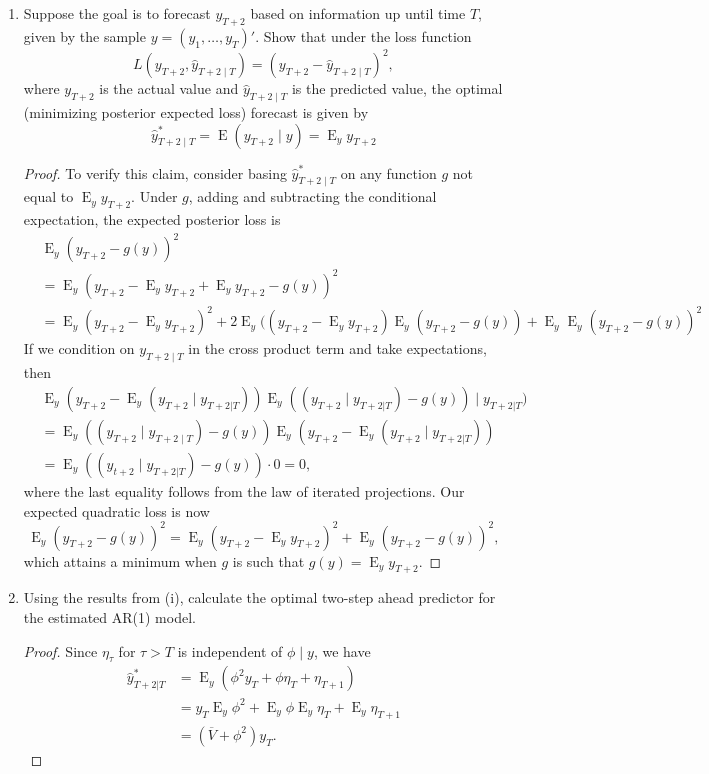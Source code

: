 \documentclass[oneside,reqno]{amsart}
\DeclareMathOperator{\E}{E}
\theoremstyle{definition}
\begin{document}
\begin{enumerate}
\item
Suppose the goal is to forecast $y_{T+2}$ based on information up until time
$T$, given by the sample $y = (y_1,\dotsc,y_T)'$. Show that under the loss function
\begin{equation}
	L(y_{T+2}, \hat y_{T+2 \mid T}) = (y_{T+2} - \hat y_{T+2 \mid T})^2,
\end{equation}
where $y_{T+2}$ is the actual value and $\hat y_{T+2 \mid T}$ is the predicted value, the optimal (minimizing posterior expected loss) forecast is given by
\begin{equation}
	\hat y_{T+2\mid T}^* = \E(y_{T+2} \mid y) = \E_y y_{T+2}
\end{equation}

\begin{proof}
To verify this claim, consider basing $\hat y_{T+2\mid T}^*$ on any function $g$ not equal to $\E_y y_{T+2}$. Under $g$, adding and subtracting the conditional expectation, the expected posterior loss is
\begin{align*}
	& \E_y (y_{T+2} - g(y))^2 \\
	&= \E_y (y_{T+2} - \E_y y_{T+2}  + \E_y y_{T+2} - g(y))^2  \\
	&= \E_y (y_{T+2} - \E_y y_{T+2})^2 + 2 \E_y ((y_{T+2} - \E_y y_{T+2}) \E_y (y_{T+2}  - g(y)) + \E_y \E_y (y_{T+2} - g(y))^2
\end{align*}
If we condition on $y_{T+2\mid T}$ in the cross product term and take expectations, then
\begin{align*}
	& \E_y (y_{T+2} - \E_y (y_{T+2} \mid y_{T+2 | T})) \E_y ((y_{T+2} \mid y_{T+2 | T}) - g(y)) \mid y_{T+2 | T}) \\
	&= \E_y ((y_{T+2} \mid y_{T+2 \mid T}) - g(y)) \E_y (y_{T+2} - \E_y (y_{T+2} \mid y_{T+2 | T})) \\
	&=\E_y ((y_{t+2} \mid y_{T+2 | T}) - g(y)) \cdot 0 = 0,
\end{align*}
where the last equality follows from the law of iterated projections. Our expected quadratic loss is now 
\[
	\E_y (y_{T+2} - g(y))^2 = \E_y (y_{T+2} -  \E_y y_{T+2} )^2 + \E_y (y_{T+2} - g(y))^2,
\]
which attains a minimum when $g$ is such that $g(y) = \E_y y_{T+2}$.
\end{proof}

\item
Using the results from (i), calculate the optimal two-step ahead predictor
for the estimated AR(1) model.

\begin{proof}
Since $\eta_\tau$ for $\tau >  T$ is independent of $\phi \mid y$, we have 
\begin{align*}
	\hat y_{T+2| T}^* &= \E_y (\phi^2y_T + \phi \eta_T + \eta_{T+1}) \\
	&=y_T \E_y\phi^2  + \E_y \phi \E_y \eta_T + \E_y \eta_{T+1} \\
	&= (\overline V + \phi^2) y_T.
\end{align*}
\end{proof}
\end{enumerate}
\end{document}
